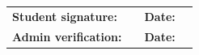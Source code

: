 \documentclass[11pt,a4paper]{article}
\renewcommand\arraystretch{1.2}
\newif\ifiucstrip \iucstriptrue
\begin{document}
\vspace{6pt}
\renewcommand\arraystretch{2.0}
\begin{tabularx}{\textwidth}{@{}p{38mm}X p{12mm}p{30mm}@{}}
\textbf{Student signature:}  & \hrulefill & \textbf{Date:} & \hrulefill \\
\textbf{Admin verification:} & \hrulefill & \textbf{Date:} & \hrulefill \\
\end{tabularx}
\renewcommand\arraystretch{1.2}
\restoregeometry
\clearpage
\iucstriptrue

\clearpage
\iucstripfalse

\end{document}
